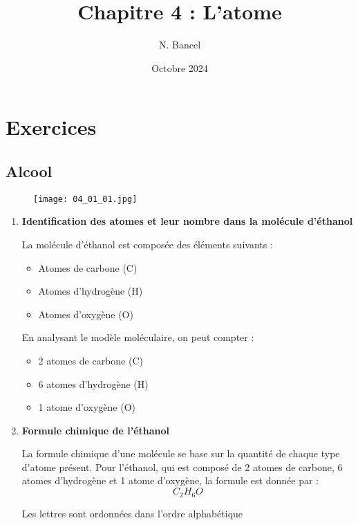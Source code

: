 \documentclass[a4paper,12pt]{article}
\begin{document}
\title{Chapitre 4 : L'atome}
\author{N. Bancel}
\date{Octobre 2024}
\maketitle

\section{Exercices}

\subsection{Alcool}


\begin{figure}[H]
  \centering
  \texttt{[image: 04\_01\_01.jpg]}
\end{figure}



\begin{enumerate}
  \item \textbf{Identification des atomes et leur nombre dans la molécule d'éthanol}
  
  La molécule d'éthanol est composée des éléments suivants :
  \begin{itemize}[noitemsep]
      \item Atomes de carbone (C)
      \item Atomes d'hydrogène (H)
      \item Atomes d'oxygène (O)
  \end{itemize}
  
  En analysant le modèle moléculaire, on peut compter :
  \begin{itemize}[noitemsep]
      \item 2 atomes de carbone (C)
      \item 6 atomes d'hydrogène (H)
      \item 1 atome d'oxygène (O)
  \end{itemize}
  
  \item \textbf{Formule chimique de l'éthanol}
  
  La formule chimique d'une molécule se base sur la quantité de chaque type d'atome présent. Pour l'éthanol, qui est composé de 2 atomes de carbone, 6 atomes d'hydrogène et 1 atome d'oxygène, la formule est donnée par :
  \[
  C_2H_6O
  \]
  
 Les lettres sont ordonnées dans l'ordre alphabétique
\end{enumerate}
\end{document}
